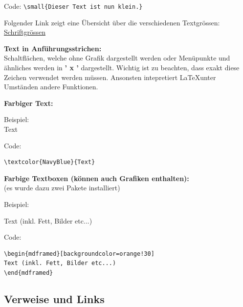 \vspace{\baselineskip}

Code: \verb+\small{Dieser Text ist nun klein.}+

\vspace{\baselineskip}

Folgender Link zeigt eine Übersicht über die verschiedenen Textgrössen: \href{https://de.overleaf.com/learn/latex/Font_sizes,_families,_and_styles}{\color{blue} Schriftgrössen}  

\vspace{\baselineskip}

\textbf{Text in Anführungsstrichen:}\\
Schaltflächen, welche ohne Grafik dargestellt werden oder Menüpunkte und ähnliches werden in \textbf{' x '} dargestellt. Wichtig ist zu beachten, dass exakt diese Zeichen verwendet werden müssen. Ansonsten intepretiert \LaTeX \enspace unter Umständen andere Funktionen.

\vspace{\baselineskip}

\textbf{Farbiger Text:}

Beispiel:\\
\textcolor{NavyBlue}{Text}

Code:

\begin{verbatim}
\textcolor{NavyBlue}{Text}
\end{verbatim}

\vspace{\baselineskip}

\textbf{Farbige Textboxen (können auch Grafiken enthalten):}\\
(es wurde dazu zwei Pakete installiert)

Beispiel:
\begin{mdframed}[backgroundcolor=orange!30] 
Text (inkl. Fett, Bilder etc...)
\end{mdframed}

Code:
\begin{verbatim}
\begin{mdframed}[backgroundcolor=orange!30] 
Text (inkl. Fett, Bilder etc...)
\end{mdframed}
\end{verbatim}




\subsection{Verweise und Links}

